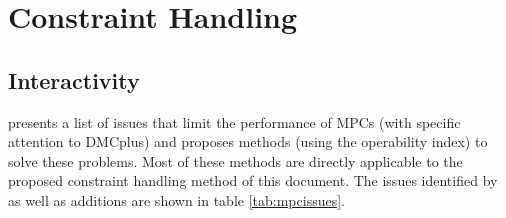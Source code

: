 \chapter{Constraint Handling}\label{chap:conhand}
\begin{overview}
\end{overview}

\section{Interactivity}
\citet{vinsonphd} presents a list of issues that limit the performance of MPCs (with specific attention to DMCplus) and proposes methods (using the operability index) to solve these problems. 
Most of these methods are directly applicable to the proposed constraint handling method of this document. 
The issues identified by \citet{vinsonphd} as well as additions are shown in table
\ref{tab:mpcissues}.
